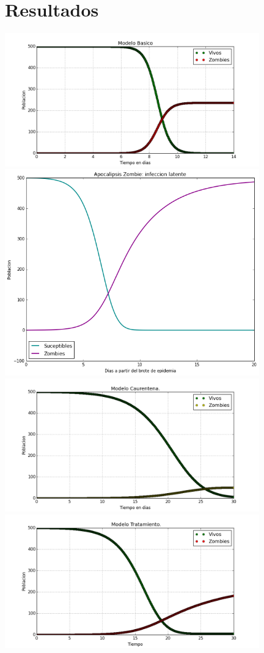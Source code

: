 \documentclass[a4paper]{article}
\begin{document}
\section{Resultados}
\includegraphics[width=11cm]{modelo_basico}\\
\includegraphics[width=11cm]{infeccion_latente}\\
\includegraphics[width=11cm]{modelo_cuarentena}\\
\includegraphics[width=11cm]{modelo_tratamiento}\\
\end{document}
